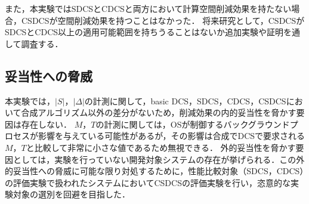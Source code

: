 また，本実験ではSDCSとCDCSと両方において計算空間削減効果を持たない場合，CSDCSが空間削減効果を持つことはなかった．
将来研究として，CSDCSがSDCSとCDCS以上の適用可能範囲を持ちうることはないか追加実験や証明を通して調査する．

\subsection{妥当性への脅威}
本実験では，$|S|$，$|\Delta|$の計測に関して，basic DCS，SDCS，CDCS，CSDCSにおいて合成アルゴリズム以外の差分がないため，削減効果の内的妥当性を脅かす要因は存在しない．
$M$，$T$の計測に関しては，OSが制御するバックグラウンドプロセスが影響を与えている可能性があるが，その影響は合成でDCSで要求される$M$，$T$と比較して非常に小さな値であるため無視できる．
外的妥当性を脅かす要因としては，実験を行っていない開発対象システムの存在が挙げられる．この外的妥当性への脅威に可能な限り対処するために，性能比較対象（SDCS，CDCS）の評価実験で扱われたシステムにおいてCSDCSの評価実験を行い，恣意的な実験対象の選別を回避を目指した．






